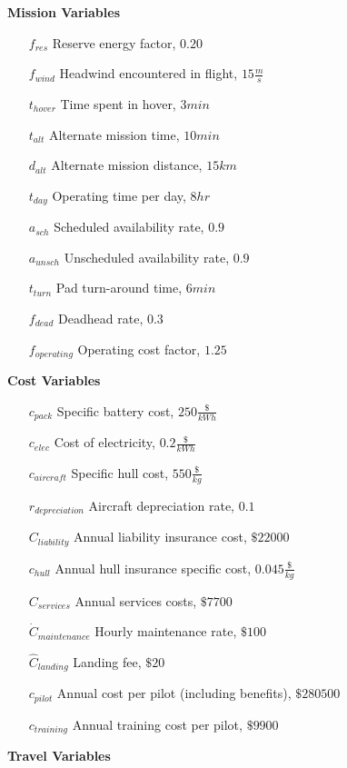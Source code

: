 \documentclass[12pt, letter]{article}
\begin{document}
\textbf{Mission Variables}
\begin{itemize}
	\item[$f_{res}$] Reserve energy factor, $0.20$
	\item[$f_{wind}$] Headwind encountered in flight, $15 \frac{m}{s}$
	\item[$t_{hover}$] Time spent in hover, $3 min$
	\item[$t_{alt}$] Alternate mission time, $10 min$
	\item[$d_{alt}$] Alternate mission distance, $15 km$
	\item[$t_{day}$] Operating time per day, $8 hr$
	\item[$a_{sch}$] Scheduled availability rate, $0.9$
	\item[$a_{unsch}$] Unscheduled availability rate, $0.9$
	\item[$t_{turn}$] Pad turn-around time, $6 min$
	\item[$f_{dead}$] Deadhead rate, $0.3$
	\item[$f_{operating}$] Operating cost factor, $1.25$
	\item[]
\end{itemize}
\textbf{Cost Variables}
\begin{itemize}
	\item[$c_{pack}$] Specific battery cost, $250 \frac{\$}{kWh}$
	\item[$c_{elec}$] Cost of electricity, $0.2 \frac{\$}{kWh}$
	\item[$c_{aircraft}$] Specific hull cost, $550 \frac{\$}{kg}$
	\item[$r_{depreciation}$] Aircraft depreciation rate, $0.1$
	\item[$C_{liability}$] Annual liability insurance cost, $\$22000$
	\item[$c_{hull}$] Annual hull insurance specific cost, $0.045 \frac{\$}{kg}$
	\item[$C_{services}$] Annual services costs, $\$7700$
	\item[$\dot{C}_{maintenance}$] Hourly maintenance rate, $\$100$
	\item[$\hat{C}_{landing}$] Landing fee, $\$20$
	\item[$c_{pilot}$] Annual cost per pilot (including benefits), $\$280500$
	\item[$c_{training}$] Annual training cost per pilot, $\$9900$
	\item[]
\end{itemize}
\textbf{Travel Variables}
\end{document}
